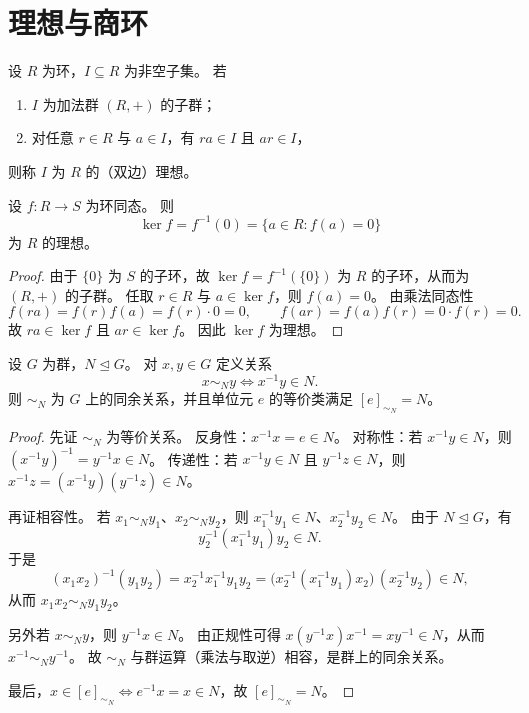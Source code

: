 \documentclass[lang=cn,a4paper,newtx]{elegantbook}
\begin{document}
\section{理想与商环}

\begin{definition}[理想]
设 $R$ 为环，$I\subseteq R$ 为非空子集。
若
\begin{enumerate}
  \item $I$ 为加法群 $(R,+)$ 的子群；
  \item 对任意 $r\in R$ 与 $a\in I$，有 $ra\in I$ 且 $ar\in I$，
\end{enumerate}
则称 $I$ 为 $R$ 的（双边）理想。
\end{definition}

\begin{proposition}
设 $f:R\to S$ 为环同态。
则
\[
  \ker f=f^{-1}(0)=\{a\in R:f(a)=0\}
\]
为 $R$ 的理想。
\end{proposition}

\begin{proof}
由于 $\{0\}$ 为 $S$ 的子环，故 $\ker f=f^{-1}(\{0\})$ 为 $R$ 的子环，从而为 $(R,+)$ 的子群。
任取 $r\in R$ 与 $a\in \ker f$，则 $f(a)=0$。
由乘法同态性
\[
  f(ra)=f(r)f(a)=f(r)\cdot 0=0,\qquad f(ar)=f(a)f(r)=0\cdot f(r)=0.
\]
故 $ra\in \ker f$ 且 $ar\in \ker f$。
因此 $\ker f$ 为理想。
\end{proof}

\begin{proposition}[正规子群诱导的群同余]
设 $G$ 为群，$N\trianglelefteq G$。
对 $x,y\in G$ 定义关系
\[
  x\sim_N y\iff x^{-1}y\in N.
\]
则 $\sim_N$ 为 $G$ 上的同余关系，并且单位元 $e$ 的等价类满足 $[e]_{\sim_N}=N$。
\end{proposition}

\begin{proof}
先证 $\sim_N$ 为等价关系。
反身性：$x^{-1}x=e\in N$。
对称性：若 $x^{-1}y\in N$，则 $(x^{-1}y)^{-1}=y^{-1}x\in N$。
传递性：若 $x^{-1}y\in N$ 且 $y^{-1}z\in N$，则 $x^{-1}z=(x^{-1}y)(y^{-1}z)\in N$。

再证相容性。
若 $x_1\sim_N y_1$、$x_2\sim_N y_2$，则 $x_1^{-1}y_1\in N$、$x_2^{-1}y_2\in N$。
由于 $N\trianglelefteq G$，有
\[
  y_2^{-1}(x_1^{-1}y_1)y_2\in N.
\]
于是
\[
  (x_1x_2)^{-1}(y_1y_2)=x_2^{-1}x_1^{-1}y_1y_2=\bigl(x_2^{-1}(x_1^{-1}y_1)x_2\bigr)\,(x_2^{-1}y_2)\in N,
\]
从而 $x_1x_2\sim_N y_1y_2$。

另外若 $x\sim_N y$，则 $y^{-1}x\in N$。
由正规性可得 $x(y^{-1}x)x^{-1}=xy^{-1}\in N$，从而 $x^{-1}\sim_N y^{-1}$。
故 $\sim_N$ 与群运算（乘法与取逆）相容，是群上的同余关系。

最后，$x\in [e]_{\sim_N}\iff e^{-1}x=x\in N$，故 $[e]_{\sim_N}=N$。
\end{proof}
\end{document}
